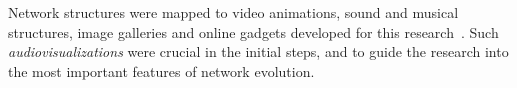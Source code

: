 \documentclass[%
	aip,
	jmp,%
	amsmath,amssymb,
	reprint,%
]{revtex4-1}
\begin{document}
																																																																																Network structures were mapped to video animations, sound and musical structures, image galleries and online gadgets developed for this research~\cite{animacoes,galGmane,appGmane}. Such \emph{audiovisualizations} were crucial in the initial steps, and
																																																																																to guide the research into the most important features of network evolution.

\end{document}
